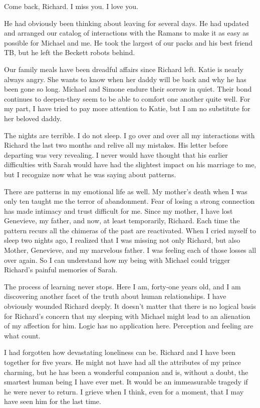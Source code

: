\documentclass[]{article}
\begin{document}
Come back, Richard.  I miss you.  I love you.

He had obviously been thinking about leaving for several days.  He had updated and arranged our catalog of interactions with the Ramans to make it as easy as possible for Michael and me.  He took the largest of our packs and his best friend TB, but he left the Beckett robots behind.

Our family meals have been dreadful affairs since Richard left.  Katie is nearly always angry.  She wants to know when her daddy will be back and why he has been gone so long.  Michael and Simone endure their sorrow in quiet.  Their bond continues to deepen-they seem to be able to comfort one another quite well.  For my part, I have tried to pay more attention to Katie, but I am no substitute for her beloved daddy.

The nights are terrible.  I do not sleep.  I go over and over all my interactions with Richard the last two months and relive all my mistakes.  His letter before departing was very revealing.  I never would have thought that his earlier difficulties with Sarah would have had the slightest impact on his marriage to me, but I recognize now what he was saying about patterns.

There are patterns in my emotional life as well.  My mother’s death when I was only ten taught me the terror of abandonment.  Fear of losing a strong connection has made intimacy and trust difficult for me.  Since my mother, I have lost Genevieve, my father, and now, at least temporarily, Richard.  Each time the pattern recurs all the chimeras of the past are reactivated.  When I cried myself to sleep two nights ago, I realized that I was missing not only Richard, but also Mother, Genevieve, and my marvelous father.  I was feeling each of those losses all over again.  So I can understand how my being with Michael could trigger Richard’s painful memories of Sarah.

The process of learning never stops.  Here I am, forty-one years old, and I am discovering another facet of the truth about human relationships.  I have obviously wounded Richard deeply.  It doesn’t matter that there is no logical basis for Richard’s concern that my sleeping with Michael might lead to an alienation of my affection for him.  Logic has no application here.  Perception and feeling are what count.

I had forgotten how devastating loneliness can be.  Richard and I have been together for five years.  He might not have had all the attributes of my prince charming, but he has been a wonderful companion and is, without a doubt, the smartest human being I have ever met.  It would be an immeasurable tragedy if he were never to return.  I grieve when I think, even for a moment, that I may have seen him for the last time.
\end{document}
